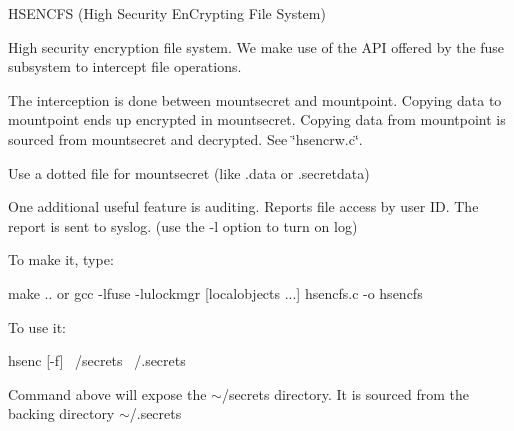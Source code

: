 HSENCFS (High Security En\+Crypting File System)

High security encryption file system. We make use of the API offered by the fuse subsystem to intercept file operations.

The interception is done between mountsecret and mountpoint. Copying data to mountpoint ends up encrypted in mountsecret. Copying data from mountpoint is sourced from mountsecret and decrypted. See \char`\"{}hsencrw.\+c\char`\"{}.

Use a dotted file for mountsecret (like .data or .secretdata)

One additional useful feature is auditing. Reports file access by user ID. The report is sent to syslog. (use the -\/l option to turn on log)

To make it, type\+: \begin{DoxyVerb}make
.. or gcc -lfuse -lulockmgr [localobjects ...] hsencfs.c -o hsencfs
\end{DoxyVerb}
 To use it\+: \begin{DoxyVerb} hsenc [-f] ~/secrets  ~/.secrets
\end{DoxyVerb}
 Command above will expose the $\sim$/secrets directory. It is sourced from the backing directory $\sim$/.secrets 